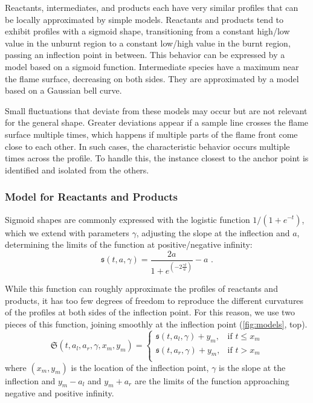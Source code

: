 %
Reactants, intermediates, and products each have very similar profiles that can
be locally approximated by simple models.
%
Reactants and products tend to exhibit profiles with a sigmoid shape,
transitioning from a constant high/low value in the unburnt region to a constant
low/high value in the burnt region, passing an inflection point in between.
%
This behavior can be expressed by a model based on a sigmoid function.
%
Intermediate species have a maximum near the flame surface, decreasing on both
sides.
%
They are approximated by a model based on a Gaussian bell curve.
%

%
Small fluctuations that deviate from these models may occur but are not relevant
for the general shape.
%
Greater deviations appear if a sample line crosses the flame surface multiple
times, which happens if multiple parts of the flame front come close to each
other.
%
In such cases, the characteristic behavior occurs multiple times across the
profile.
%
To handle this, the instance closest to the anchor point is identified and
isolated from the others.
%
\subsubsection{Model for Reactants and Products} %
\label{ssub:model_for_reactants_products}
%
Sigmoid shapes are commonly expressed with the logistic function $1/(1+e^{-t})$,
which we extend with parameters $\gamma$, adjusting the slope at the inflection
and $a$, determining the limits of the function at positive/negative infinity:
%
\begin{equation}
	\mathfrak{s}(t,a,\gamma)
		= \frac{2a}{ 1 + e^{ (-2\frac{\gamma t}{a}) } } - a \text{ .}
\end{equation}
%

%
While this function can roughly approximate the profiles of reactants and
products, it has too few degrees of freedom to reproduce the different
curvatures of the profiles at both sides of the inflection point.
%
For this reason, we use two pieces of this function, joining smoothly at the
inflection point (\cref{fig:models}, top).
%
\begin{equation}
		\mathfrak{S}(t, a_l, a_r, \gamma, x_m, y_m) =
		\begin{cases}
			\mathfrak{s}(t, a_l, \gamma) + y_m, &\text{if }  t \leq x_m\\
			\mathfrak{s}(t, a_r, \gamma) + y_m, & \text{if }  t > x_m\\
		\end{cases}
\end{equation}
%
where $(x_m, y_m)$ is the location of the
inflection point, $\gamma$ is the slope at the inflection and $y_m-a_l$ and
$y_m+a_r$ are the limits of the function approaching negative and positive
infinity.
%
%
